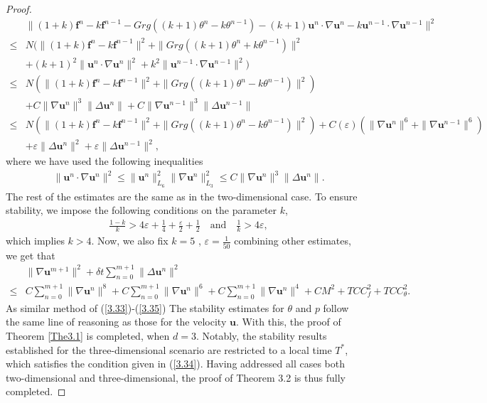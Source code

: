 \documentclass[10pt,a4paper]{amsart}
\theoremstyle{thmm}
\begin{document}
\begin{proof}
\begin{align}
			&\|(1+k)\bm{f}^n-k\bm{f}^{n-1}-Grg((k+1)\theta^n-k\theta^{n-1})-{ (k+1)\bm{u}^n\cdot\nabla\bm{u}^n-k\bm{u}^{n-1}\cdot\nabla\bm{u}^{n-1}}\|^2\nonumber\\
			\leq & N(\|(1+k)\bm{f}^n-k\bm{f}^{n-1}\|^2+\|Grg((k+1)\theta^n+k\theta^{n-1})\|^2\nonumber\\
			& +{ (k+1)^2\|\bm{u}^n\cdot\nabla\bm{u}^n\|^2+k^2\|\bm{u}^{n-1}\cdot\nabla\bm{u}^{n-1}\|^2})\nonumber\\
			\leq & N(\|(1+k)\bm{f}^n-k\bm{f}^{n-1}\|^2+\|Grg((k+1)\theta^n-k\theta^{n-1})\|^2)\nonumber\\
			&+C{ \|\nabla\bm{u}^n\|^3\|\Delta\bm{u}^n\|+C\|\nabla\bm{u}^{n-1}\|^3\|\Delta\bm{u}^{n-1}\|}\nonumber\\
			\leq & N(\|(1+k)\bm{f}^n-k\bm{f}^{n-1}\|^2+\|Grg((k+1)\theta^n-k\theta^{n-1})\|^2)  +C(\varepsilon)({ \|\nabla\bm{u}^n\|^6+\|\nabla\bm{u}^{n-1}\|^6})\nonumber\\
			&+\varepsilon\|\Delta\bm{u}^n\|^2+\varepsilon\|\Delta\bm{u}^{n-1}\|^2,
		\end{align}
		where we have used the following inequalities
		\begin{align}
			&\|\bm{u}^n\cdot\nabla\bm{u}^n\|^2\leq\|\bm{u}^n\|_{L_6}^2\|\nabla\bm{u}^n\|_{L_3}^2\leq C\|\nabla\bm{u}^n\|^3\|\Delta\bm{u}^n\|.
		\end{align}
		The rest of the estimates are the same as in the two-dimensional case.  To ensure stability, we impose the following conditions on the parameter \( k \),  
		\begin{align*}
			&\frac{1-k}{k}>4\varepsilon+\frac{1}{4}+\frac{\varepsilon}{2}+\frac{1}{2}  \quad\text{and} \quad \frac{1}{k}>4\varepsilon,
		\end{align*}
		which implies $k>4$. Now, we also fix $k=5$ , $\varepsilon=\frac{1}{50}$ combining other estimates, we get that
		{ \begin{align}
			&\|\nabla\bm{u}^{m+1}\|^2 + \delta t \sum_{n=0}^{m+1} \|\Delta\bm{u}^n\|^2 \label{eq:u-estimate} \nonumber\\
			\leq & C \sum_{n=0}^{m+1} \|\nabla\bm{u}^{n}\|^8 + C \sum_{n=0}^{m+1} \|\nabla\bm{u}^{n}\|^6 + C \sum_{n=0}^{m+1} \|\nabla\bm{u}^{n}\|^4 + C M^2 + T C C_f^2 + T C C_{\theta}^2.
		\end{align}}
	As similar method of (\ref{3.33})-(\ref{3.35})
		The stability estimates for \(\theta\) and $p$ follow the same line of reasoning as those for the velocity \(\bm{u}\). With this, the proof of Theorem \ref{The3.1} is completed, when $d=3$. Notably, the stability results established for the three-dimensional scenario are restricted to a local time \(T^*\), which satisfies the condition given in (\ref{3.34}). Having addressed all cases both two-dimensional and three-dimensional, the proof of Theorem 3.2 is thus fully completed.  
	\end{proof}
\end{document}
